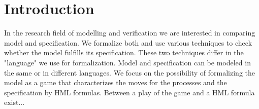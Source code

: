 \section{Introduction}
In the research field of modelling and verification we are interested in comparing model and specification.
We formalize both and use various techniques to check whether the model fulfills its specification.
These two techniques differ in the "language" we use for formalization.
Model and specification can be modeled in the same or in different languages.
We focus on the possibility of formalizing the model as a game that characterizes the moves for the processes and the specification by HML formulas.
Between a play of the game and a HML formula exist...

